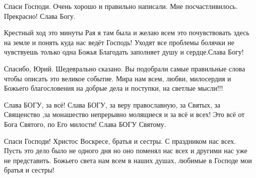 \begin{itemize}
Спаси Господи. Очень хорошо и правильно написали. Мне посчастливилось. Прекрасно! Слава Богу.

 

Крестный ход это минуты Рая я там была и желаю всем это почувствовать здесь на
земле и понять куда нас ведёт Господь! Уходят все проблемы болячки не
чувствуешь только одна Божья Благодать заполняет душу и сердце.Слава Богу!


 

Спасибо, Юрий. Шедеврально сказано. Вы подобрали самые правильные слова чтобы
описать это великое событие. Мира нам всем, любви, милосердия и Божьего
благословения на добрые дела и поступки, на светлые мысли!!!


 

Слава БОГУ, за всё! Слава БОГУ, за веру православную, за Святых, за Священство ,за
монашество непрерывно молящиеся и за всё и всех! Это всё от Бога Святого, по Его
милости! Слава БОГУ Святому.🙏

 

Спаси Господи! Христос Воскресе, братья и сестры. С праздником нас всех. Пусть
это дело было не одного дня но оно поменял нас всех и другими нас уже не
представить. Божьего света нам всем в наших душах, любимые в Господе мои братья
и сестры!

\begin{itemize}
 

\end{itemize}
\end{itemize}
